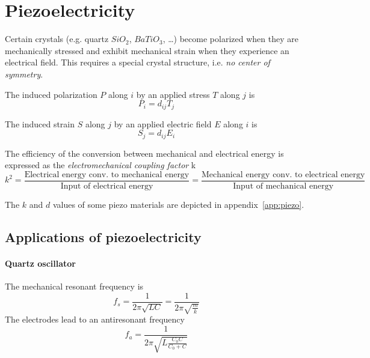 \section{Piezoelectricity}

Certain crystals (e.g. quartz $SiO_2$, $BaTiO_3$, \ldots) become polarized
when they are mechanically stressed and exhibit mechanical strain when
they experience an electrical field.
This requires a special crystal structure, i.e. \emph{no center of symmetry}.

The induced polarization $P$ along $i$ by an applied stress $T$ along $j$ is
\begin{equation}
    P_i = d_{ij} T_j
\end{equation}

The induced strain $S$ along $j$ by an applied electric field $E$ along $i$ is
\begin{equation}
    S_j = d_{ij} E_i
\end{equation}


The efficiency of the conversion between mechanical and electrical energy is
expressed as the \emph{electromechanical coupling factor} k
\begin{equation}
    k^2 = \frac{\text{Electrical energy conv. to mechanical energy}}{\text{Input of electrical energy}} = \frac{\text{Mechanical energy conv. to electrical energy}}{\text{Input of mechanical energy}}
\end{equation}

The $k$ and $d$ values of some piezo materials are depicted in appendix~\ref{app:piezo}.

\subsection{Applications of piezoelectricity}
\paragraph{Quartz oscillator}
The mechanical resonant frequency is
\begin{equation}
    f_s = \frac{1}{2\pi\sqrt{LC}} = \frac{1}{2\pi\sqrt{\frac{m}{k}}}
\end{equation}
The electrodes lead to an antiresonant frequency
\begin{equation}
    f_a = \frac{1}{2\pi\sqrt{L\frac{C_0C}{C_0+C}}}
\end{equation}

